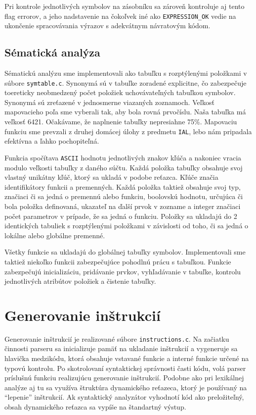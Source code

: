 \documentclass [11pt, a4paper]{article}
\begin{document}
Pri kontrole jednotlivých symbolov na zásobníku sa zároveň kontroluje aj tento flag errorov, a jeho nadstavenie na čokoľvek iné ako \texttt{EXPRESSION\_OK} vedie na ukončenie spracovávania výrazov s adekvátnym návratovým kódom.

\subsection{Sématická analýza}
Sématickú analýzu sme implementovali ako tabuľku s rozptýlenými položkami v súbore \texttt{symtable.c}. Synonymá sú v tabuľke zoradené explicitne, čo zabezpečuje toereticky neobmedzený počet položiek uchovávateľných tabuľkou symbolov. Synonymá sú zreťazené v jednosmerne viazaných zoznamoch. Veľkosť mapovacieho poľa sme vyberali tak, aby bola rovná prvočíslu. Naša tabuľka má veľkosť 6421. Očakávame, že naplnenie tabuľky nepresiahne 75\%. Mapovaciu funkciu sme prevzali z druhej domácej úlohy z predmetu \texttt{IAL}, lebo nám pripadala efektívna a ľahko pochopiteľná. 

Funkcia spočítava \texttt{ASCII} hodnotu jednotlivých znakov kľúča a nakoniec vracia modulo veľkosti tabuľky z daného súčtu. Každá položka tabuľky obsahuje svoj vlastný unikátny kľúč, ktorý sa ukladá v podobe reťazca. Kľúče značia identifikátory funkcii a premenných. Každá položka taktiež obsahuje svoj typ, značiaci či sa jedná o premennú alebo funkciu, boolovskú hodnotu, určujúca či bola položka definovaná, ukazateľ na ďalší prvok v zozname a integer značiaci počet parametrov v prípade, že sa jedná o funkciu. Položky sa ukladajú do 2 identických tabuliek s rozptýlenými položkami v závislosti od toho, či sa jedná o lokálne alebo globálne premenné.

Všetky funkcie sa ukladajú do globálnej tabuľky symbolov. Implementovali sme taktiež niekoľko funkcii zabezpečujúce pohodlnú prácu s tabuľkou. Funkcie zabezpečujú inicializáciu, pridávanie prvkov, vyhľadávanie v tabuľke, kontrolu jednotlivých atribútov položiek a čistenie tabuľky.

\section{Generovanie inštrukcií}
Generovanie inštrukcií je realizované súbore \texttt{instructions.c}. Na začiatku činnosti parseru sa inicializuje pamäť na ukladanie inštrukcií a vygeneruje sa hlavička medzikódu, ktorá obsahuje vstavané funkcie a interné funkcie určené na typovú kontrolu. Po skotrolovaní syntaktickej správnosti časti kódu, volá parser príslušnú funkciu realizujúcu generovanie inštrukcií. Podobne ako pri lexikálnej analýze aj tu sa využíva štruktúra dynamického reťazeca, ktorý je používaný na ``lepenie'' inštrukcií. Ak syntaktický analyzátor vyhodnotí kód ako preložiteľný, obsah dynamického reťazca sa vypíše na štandartný výstup.
\end{document}
